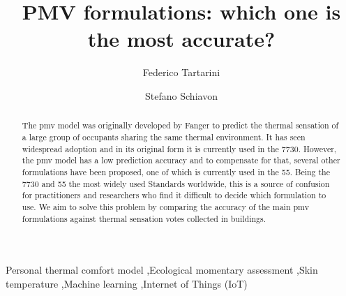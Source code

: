 
\begin{frontmatter}

    \title{PMV formulations: which one is the most accurate?}

    \author[label1]{Federico Tartarini}
    \author[label2]{Stefano Schiavon}

    \address[label1]{Berkeley Education Alliance for Research in Singapore, Singapore}
    \address[label2]{Center for the Built Environment, University of California, Berkeley, CA, USA}


    \begin{abstract}
        The \ac{pmv} model was originally developed by Fanger to predict the thermal sensation of a large group of occupants sharing the same thermal environment.
        It has seen widespread adoption and in its original form it is currently used in the \gls{7730}.
        However, the \ac{pmv} model has a low prediction accuracy and to compensate for that, several other formulations have been proposed, one of which is currently used in the \gls{55}.
        Being the \gls{7730} and \gls{55} the most widely used Standards worldwide, this is a source of confusion for practitioners and researchers who find it difficult to decide which formulation to use.
        We aim to solve this problem by comparing the accuracy of the main \ac{pmv} formulations against  thermal sensation votes collected in buildings.
    \end{abstract}

    \begin{keyword}
        Personal thermal comfort model \sep Ecological momentary assessment \sep Skin temperature \sep Machine learning \sep Internet of Things (IoT)
    \end{keyword}

\end{frontmatter}
